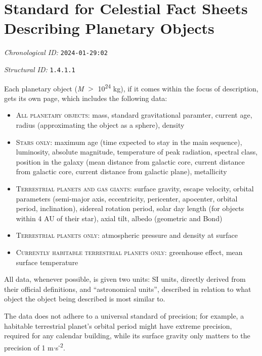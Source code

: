 \section{Standard for Celestial Fact Sheets Describing Planetary Objects}
\emph{Chronological ID:} \texttt{2024-01-29:02}

\emph{Structural ID:} \texttt{1.4.1.1}

Each planetary object (\emph{M} $>$ 10\textsuperscript{24} kg), if it comes within the focus of description, gets its own page, which includes the following data:

\begin{itemize}
  \item \textsc{All planetary objects:} mass, standard gravitational paramter, current age, radius (approximating the object as a sphere), density
  \item \textsc{Stars only:} maximum age (time expected to stay in the main sequence), luminosity, absolute magnitude, temperature of peak radiation, spectral class, position in the galaxy (mean distance from galactic core, current distance from galactic core, current distance from galactic plane), metallicity
  \item \textsc{Terrestrial planets and gas giants:} surface gravity, escape velocity, orbital parameters (semi-major axis, eccentricity, pericenter, apocenter, orbital period, inclination), sidereal rotation period, solar day length (for objects within 4 AU of their star), axial tilt, albedo (geometric and Bond)
  \item \textsc{Terrestrial planets only:} atmospheric pressure and density at surface
  \item \textsc{Currently habitable terrestrial planets only:} greenhouse effect, mean surface temperature
\end{itemize}

All data, whenever possible, is given two units: SI units, directly derived from their official definitions, and ``astronomical units'', described in relation to what object the object being described is most similar to.

The data does not adhere to a universal standard of precision; for example, a habitable terrestrial planet's orbital period might have extreme precision, required for any calendar building, while its surface gravity only matters to the precision of 1 m$\cdot$s\textsuperscript{-2}.
\newpage
